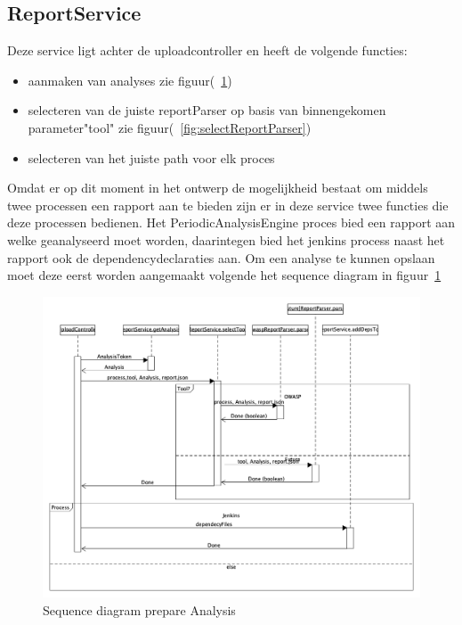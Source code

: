 \subsection{ReportService}\label{subsec:reportservice}
Deze service ligt achter de uploadcontroller en heeft de volgende functies:
\begin{itemize}
    \item aanmaken van analyses zie figuur(~\ref{fig:analysisPrepare})
    \item selecteren van de juiste reportParser op basis van binnengekomen parameter"tool" zie figuur(~\ref{fig:selectReportParser})
    \item selecteren van het juiste path voor elk proces
\end{itemize}

Omdat er op dit moment in het ontwerp de mogelijkheid bestaat om middels twee processen een rapport aan te bieden zijn er in deze service twee functies die deze processen bedienen.
Het PeriodicAnalysisEngine proces bied een rapport aan welke geanalyseerd moet worden, daarintegen bied het jenkins process naast het rapport ook de dependencydeclaraties aan. Om een analyse te kunnen opslaan moet deze eerst worden aangemaakt volgende het sequence diagram in figuur~\ref{fig:analysisPrepare}
\begin{figure}[bth]
    \myfloatalign
    \includegraphics[width=14cm]{gfx/umlet/exports/SeqProcessPayload}
    \caption{Sequence diagram prepare Analysis}
    \label{fig:analysisPrepare}
\end{figure}


